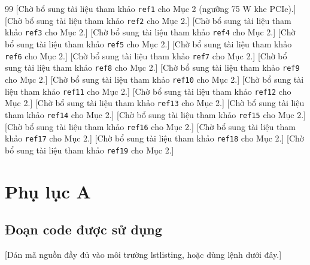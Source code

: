 \documentclass[10pt,a4paper]{article}
\begin{document}
\begin{thebibliography}{99}
   [Chờ bổ sung tài liệu tham khảo \texttt{ref1} cho Mục 2 (ngưỡng 75 W khe PCIe).]
   [Chờ bổ sung tài liệu tham khảo \texttt{ref2} cho Mục 2.]
   [Chờ bổ sung tài liệu tham khảo \texttt{ref3} cho Mục 2.]
   [Chờ bổ sung tài liệu tham khảo \texttt{ref4} cho Mục 2.]
   [Chờ bổ sung tài liệu tham khảo \texttt{ref5} cho Mục 2.]
   [Chờ bổ sung tài liệu tham khảo \texttt{ref6} cho Mục 2.]
   [Chờ bổ sung tài liệu tham khảo \texttt{ref7} cho Mục 2.]
   [Chờ bổ sung tài liệu tham khảo \texttt{ref8} cho Mục 2.]
   [Chờ bổ sung tài liệu tham khảo \texttt{ref9} cho Mục 2.]
   [Chờ bổ sung tài liệu tham khảo \texttt{ref10} cho Mục 2.]
   [Chờ bổ sung tài liệu tham khảo \texttt{ref11} cho Mục 2.]
   [Chờ bổ sung tài liệu tham khảo \texttt{ref12} cho Mục 2.]
   [Chờ bổ sung tài liệu tham khảo \texttt{ref13} cho Mục 2.]
   [Chờ bổ sung tài liệu tham khảo \texttt{ref14} cho Mục 2.]
   [Chờ bổ sung tài liệu tham khảo \texttt{ref15} cho Mục 2.]
   [Chờ bổ sung tài liệu tham khảo \texttt{ref16} cho Mục 2.]
   [Chờ bổ sung tài liệu tham khảo \texttt{ref17} cho Mục 2.]
   [Chờ bổ sung tài liệu tham khảo \texttt{ref18} cho Mục 2.]
   [Chờ bổ sung tài liệu tham khảo \texttt{ref19} cho Mục 2.]
\end{thebibliography}

\clearpage
\appendix
{}
\section*{Phụ lục A}
\subsection*{Đoạn code được sử dụng}
[Dán mã nguồn đầy đủ vào môi trường lstlisting, hoặc dùng lệnh dưới đây.]

% 
\end{document}
